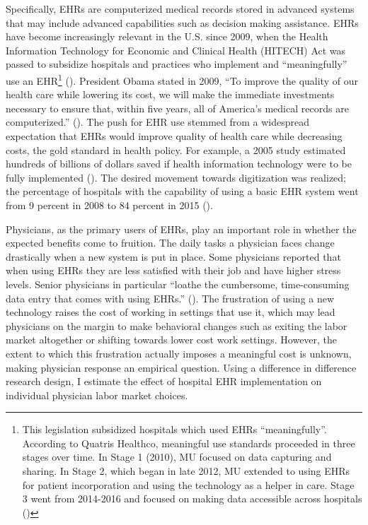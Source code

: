 \documentclass[12pt]{article}
\begin{document}
Specifically, EHRs are computerized medical records stored in advanced systems that may include advanced capabilities such as decision making assistance. EHRs have become increasingly relevant in the U.S. since 2009, when the Health Information Technology for Economic and Clinical Health (HITECH) Act was passed to subsidize hospitals and practices who implement and ``meaningfully'' use an EHR\footnote{This legislation subsidized hospitals which used EHRs “meaningfully”. According to Quatris Healthco, meaningful use standards proceeded in three stages over time. In Stage 1 (2010), MU focused on data capturing and sharing. In Stage 2, which began in late 2012, MU extended to using EHRs for patient incorporation and using the technology as a helper in care. Stage 3 went from 2014-2016 and focused on making data accessible across hospitals (\cite{meanuse})} (\cite{hitech}). President Obama stated in 2009, “To improve the quality of our health care while lowering its cost, we will make the immediate investments necessary to ensure that, within five years, all of America’s medical records are computerized.” (\cite{presquote}). The push for EHR use stemmed from a widespread expectation that EHRs would improve quality of health care while decreasing costs, the gold standard in health policy. For example, a 2005 study estimated hundreds of billions of dollars saved if health information technology were to be fully implemented (\cite{hillestad2005}). The desired movement towards digitization was realized; the percentage of hospitals with the capability of using a basic EHR system went from 9 percent in 2008 to 84 percent in 2015 (\cite{stats}).

Physicians, as the primary users of EHRs, play an important role in whether the expected benefits come to fruition. The daily tasks a physician faces change drastically when a new system is put in place. Some physicians reported that when using EHRs they are less satisfied with their job and have higher stress levels. Senior physicians in particular “loathe the cumbersome, time-consuming data entry that comes with using EHRs.” (\cite{CollierBurnout}). The frustration of using a new technology raises the cost of working in settings that use it, which may lead physicians on the margin to make behavioral changes such as exiting the labor market altogether or shifting towards lower cost work settings. However, the extent to which this frustration actually imposes a meaningful cost is unknown, making physician response an empirical question. Using a difference in difference research design, I estimate the effect of hospital EHR implementation on individual physician labor market choices.
\end{document}
